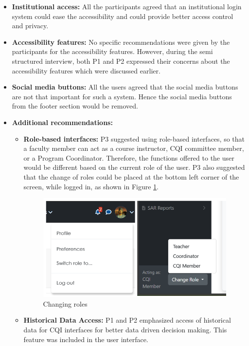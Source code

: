 \documentclass[journal,onecolumn]{IEEEtran}
\begin{document}
\begin{itemize}
\item \textbf{Institutional access: }All the participants agreed that an institutional login system could ease the accessibility and could provide better access control and privacy. 

\item \textbf{Accessibility features: }No specific recommendations were given by the participants for the accessibility features. However, during the semi structured interview, both P1 and P2 expressed their concerns about the accessibility features which were discussed earlier. 

\item \textbf{Social media buttons: }All the users agreed that the social media buttons are not that important for such a system. Hence the social media buttons from the footer section would be removed. 

\item \textbf{Additional recommendations: }

\begin{itemize}
    \item \textbf{Role-based interfaces:} P3 suggested using role-based interfaces, so that a faculty member can act as a course instructor, CQI committee member, or a Program Coordinator. Therefore, the functions offered to the user would be different based on the current role of the user. P3 also suggested that the change of roles could be placed at the bottom left corner of the screen, while logged in, as shown in Figure \ref{fig:roles}.

    \begin{figure}
        \centering
        \includegraphics[width=0.8\linewidth]{img/Picture6.png}
        \caption{Changing roles}
        \label{fig:roles}
    \end{figure}
    
    \item \textbf{Historical Data Access:} P1 and P2 emphasized access of historical data for CQI interfaces for better data driven decision making. This feature was included in the user interface.
\end{itemize}
\end{itemize}
\end{document}
